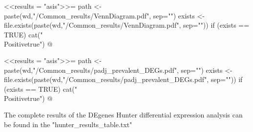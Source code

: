 \documentclass{article}
\begin{document}
\newif\ifPositive

<<results = "asis">>=
path <- paste(wd,"/Common_results/VennDiagram.pdf", sep="")
exists <- file.exists(paste(wd,"/Common_results/VennDiagram.pdf", sep=""))
if (exists == TRUE) {
  cat("\\Positivetrue")
}
@

\ifPositive
  \section{Graph concerning common results}
  \subsection{Venn Diagram}

    This is the Venn Diagram of the all possible DEGs encountered in the experiment (Image extracted from {\bf"VennDiagram.pdf"} file):
    \begin{center}
      \texttt{[image: \\Sexpr\{path]}}
    \end{center}
\fi



\newif\ifPositive

<<results = "asis">>=
path <- paste(wd,"/Common_results/padj_prevalent_DEGs.pdf", sep="")
exists <- file.exists(paste(wd,"/Common_results/padj_prevalent_DEGs.pdf", sep=""))
if (exists == TRUE) {
  cat("\\Positivetrue")
}
@

\ifPositive
  \subsection{FDR gene-wise benchmarking}

  Benchmark of false positive calling (Image extracted from {\bf"padj\_prevalent\_DEGs.pdf"} file):
  \begin{center}
    \texttt{[image: \\Sexpr\{path]}}
  \end{center}
  Estimates of P(p-value $<$ 0.05) under the null hypothesis among prevalent DEGs are shown.  
\fi


The complete results of the DEgenes Hunter differential expression analysis can be found in the "hunter\_results\_table.txt"
\end{document}
